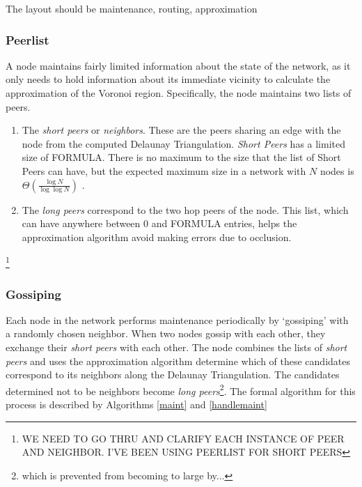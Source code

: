 \documentclass{IEEEtran}
\begin{document}
The layout should be maintenance, routing, approximation

\subsubsection*{Peerlist}
A node maintains fairly limited information about the state of the network, as it only needs to hold information about its immediate vicinity to calculate the approximation of the Voronoi region.  Specifically, the node maintains two lists of peers.
\begin{enumerate}
	\item The \textit{short peers} or \textit{neighbors}.  These are the peers sharing an edge with the node from the computed Delaunay Triangulation.  \textit{Short Peers} has a limited size of FORMULA. There is no maximum to the size that the list of Short Peers can have, but the expected maximum size in a network with $N$ nodes is $\Theta(\frac{\log N}{\log \log N} )$ \cite{bern1991expected}.  
	\item The \textit{long peers} correspond to the two hop peers of the node.  This list, which can have anywhere between 0 and FORMULA entries, helps the approximation algorithm avoid making errors due to occlusion. 
\end{enumerate}
\footnote{WE NEED TO GO THRU AND CLARIFY EACH INSTANCE OF PEER AND NEIGHBOR.  I'VE BEEN USING PEERLIST FOR SHORT PEERS}



\subsubsection*{Gossiping}

Each node in the network performs maintenance periodically by `gossiping' with a randomly chosen neighbor.  When two nodes gossip with each other, they exchange their \textit{short peers} with each other.   The node combines the lists of \textit{short peers} and uses the approximation algorithm determine which of these candidates correspond to its neighbors along the Delaunay Triangulation.  The candidates determined not to be neighbors become \textit{long peers}\footnote{which is prevented from becoming to large by...}.  The formal algorithm for this process is described by Algorithms \ref{maint} and \ref{handlemaint}
\end{document}
